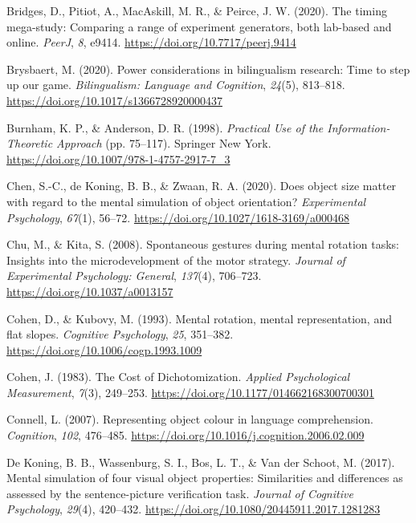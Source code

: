 \documentclass[
  man,floatsintext]{apa7}
\newlength{\cslhangindent}
\newlength{\cslentryspacingunit} %
\newenvironment{CSLReferences}[2] %
 {%
  \setlength{\parindent}{0pt}
  \ifodd #1
  \let\oldpar\par
  \def\par{\hangindent=\cslhangindent\oldpar}
  \fi
  \setlength{\parskip}{#2\cslentryspacingunit}
 }%
 {}
\begin{document}
\begin{CSLReferences}{1}{0}
\leavevmode{}%
Bridges, D., Pitiot, A., MacAskill, M. R., \& Peirce, J. W. (2020). The timing mega-study: Comparing a range of experiment generators, both lab-based and online. \emph{PeerJ}, \emph{8}, e9414. \url{https://doi.org/10.7717/peerj.9414}

\leavevmode{}%
Brysbaert, M. (2020). Power considerations in bilingualism research: Time to step up our game. \emph{Bilingualism: Language and Cognition}, \emph{24}(5), 813--818. \url{https://doi.org/10.1017/s1366728920000437}

\leavevmode{}%
Burnham, K. P., \& Anderson, D. R. (1998). \emph{Practical Use of the Information-Theoretic Approach} (pp. 75--117). Springer New York. \url{https://doi.org/10.1007/978-1-4757-2917-7_3}

\leavevmode{}%
Chen, S.-C., de Koning, B. B., \& Zwaan, R. A. (2020). Does object size matter with regard to the mental simulation of object orientation? \emph{Experimental Psychology}, \emph{67}(1), 56--72. \url{https://doi.org/10.1027/1618-3169/a000468}

\leavevmode{}%
Chu, M., \& Kita, S. (2008). Spontaneous gestures during mental rotation tasks: {Insights} into the microdevelopment of the motor strategy. \emph{Journal of Experimental Psychology: General}, \emph{137}(4), 706--723. \url{https://doi.org/10.1037/a0013157}

\leavevmode{}%
Cohen, D., \& Kubovy, M. (1993). Mental rotation, mental representation, and flat slopes. \emph{Cognitive Psychology}, \emph{25}, 351--382. \url{https://doi.org/10.1006/cogp.1993.1009}

\leavevmode{}%
Cohen, J. (1983). The Cost of Dichotomization. \emph{Applied Psychological Measurement}, \emph{7}(3), 249--253. \url{https://doi.org/10.1177/014662168300700301}

\leavevmode{}%
Connell, L. (2007). Representing object colour in language comprehension. \emph{Cognition}, \emph{102}, 476--485. \url{https://doi.org/10.1016/j.cognition.2006.02.009}

\leavevmode{}%
De Koning, B. B., Wassenburg, S. I., Bos, L. T., \& Van der Schoot, M. (2017). Mental simulation of four visual object properties: Similarities and differences as assessed by the sentence-picture verification task. \emph{Journal of Cognitive Psychology}, \emph{29}(4), 420--432. \url{https://doi.org/10.1080/20445911.2017.1281283}


\end{CSLReferences}
\end{document}
